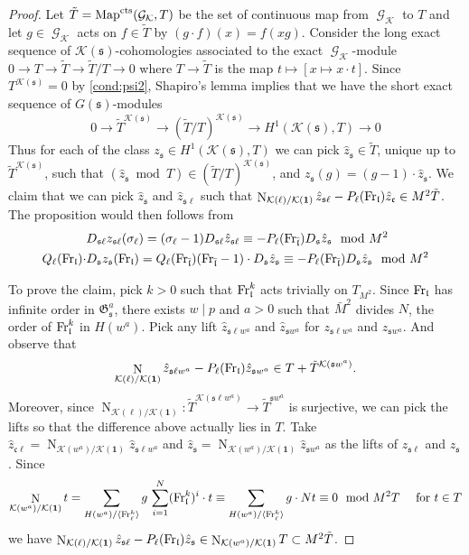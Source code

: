 \documentclass[leqno]{amsart}
\theoremstyle{definition}
\theoremstyle{remark}
\newcommand{\id}{\mathbf{1}}
\DeclareMathOperator{\Nr}{N}
\DeclareMathOperator{\Gal}{\mathcal{G}}
\newcommand{\Fr}{\textnormal{Fr}} %
\newcommand{\cts}{\textnormal{cts}}
\newcommand{\fc}{\mathfrak{c}}
\newcommand{\fl}{\mathfrak{l}}
\newcommand{\fs}{\mathfrak{s}}
\newcommand{\K}{{\mathcal{K}}} %
\newcommand{\flw}{\bar{\fl}}
\newcommand{\fG}{\mathfrak{G}}
\begin{document}
\begin{proof}

Let $\tilde{T}=\text{Map}^{\cts}(\Gal_\K,T)$
be the set of continuous map from $\Gal_\K$ to $T$
and let $g\in\Gal_\K$ acts on $f\in\tilde{T}$
by $(g\cdot f)(x)=f(xg)$.
Consider the long exact sequence 
of $\K(\fs)$-cohomologies
associated to the exact $\Gal_\K$-module
$0\to T\to \tilde{T}\to \tilde{T}/T\to 0$
where $T\to \tilde{T}$ is the map
$t\mapsto [x\mapsto x\cdot t]$.
Since $T^{\K(\fs)}=0$ by \ref{cond:psi2},
Shapiro's lemma implies that 
we have the short exact sequence of $G(\fs)$-modules
\[
	0\to\tilde{T}^{\K(\fs)}\to (\tilde{T}/T)^{\K(\fs)}\to 
	H^1(\K(\fs),T)\to 0
\]
Thus for each of the class $z_\fs\in H^1(\K(\fs),T)$
we can pick 
$\hat{z}_\fs\in \tilde{T}$,
unique up to $\tilde{T}^{\K(\fs)}$,
such that  $(\hat{z}_\fs\bmod T)\in (\tilde{T}/T)^{\K(\fs)}$,
and $z_\fs(g)=(g-1)\cdot \hat{z}_\fs$.
We claim that we can pick $\hat{z}_\fs$
and $\hat{z}_{\fs\ell}$ such that 
$\Nr_{\K(\ell)/\K(\id)}\hat{z}_{\fs\ell}-P_\ell(\Fr_\fl)
\hat{z}_{\fc}\in M^2\tilde{T}$.
The proposition would then follows from 
\begin{align*}
	&D_{\fs\ell}z_{\fs\ell}(\sigma_\ell)=
	(\sigma_\ell-1)D_{\fs\ell}\hat{z}_{\fs\ell}
	\equiv-P_\ell(\Fr_{\flw}) D_\fs \hat{z}_\fs \mod M^2\\
	Q_\ell(\Fr_\fl)\cdot
	&D_\fs z_\fs(\Fr_\fl)=
	Q_\ell(\Fr_{\flw})(\Fr_{\flw}-1)
	\cdot D_\fs \hat{z}_\fs
	\equiv-P_\ell(\Fr_{\flw}) D_\fs \hat{z}_\fs \mod M^2
\end{align*}

To prove the claim,
pick $k>0$ such that 
$\Fr_\fl^k$ acts trivially on $T_{M^2}$.
Since $\Fr_\fl$ has infinite order
in $\fG_{\fs}^a$,
there exists  $w\mid p$ and  $a>0$
such that $\bar{M}^2$ divides $N$,
the order of $\Fr_\fl^k$ in $H(w^a)$.
Pick any lift 
$\hat{z}_{\fs\ell w^a}$ and 
$\hat{z}_{\fs w^a}$  for
$z_{\fs\ell w^a}$ and 
$z_{\fs w^a}$.
And observe that 
\[
	\Nr_{\K(\ell)/\K(\id)}
	\hat{z}_{\fs\ell w^a}-P_\ell(\Fr_\fl)
	\hat{z}_{\fs w^a}\in T+\tilde{T}^{\K(\fs w^a)}.
\]
Moreover, since
$\Nr_{\K(\ell)/\K(\id)}\colon\tilde{T}^{\K(\fs\ell w^a)}\to
\tilde{T}^{\fs w^a}$  is surjective,
we can pick the lifts so that the difference
above actually lies in $T$.
Take
$\hat{z}_{\fc\ell}=\Nr_{\K(w^a)/\K(\id)}
\hat{z}_{\fs\ell w^a}$ and
$\hat{z}_{\fs}=\Nr_{\K(w^a)/\K(\id)}\hat{z}_{\fs w^a}$
as the lifts of $z_{\fs\ell}$ and $z_{\fs}$.
Since
\[
	\Nr_{\K(w^a)/\K(\id)}t=
	\sum_{H(w^a)/\langle \Fr_\ell^k\rangle}g\,
	\sum_{i=1}^{N}(\Fr_\fl^k)^i\cdot  t \equiv
	\sum_{H(w^a)/\langle \Fr_\ell^k\rangle}g\cdot
    Nt\equiv 0
	\mod M^2T\quad
	\text{ for } t\in T
\]
we have 
$\Nr_{\K(\ell)/\K(\id)}\hat{z}_{\fs\ell}-P_\ell(\Fr_\fl)
\hat{z}_{\fs}\in \Nr_{\K(w^a)/\K(\id)}T\subset M^2\tilde{T}$.
\end{proof}
\end{document}
